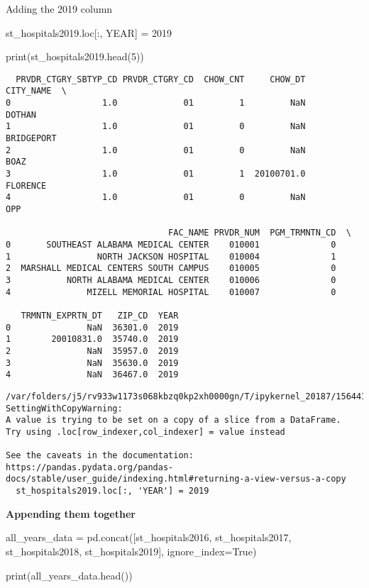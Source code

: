 \documentclass[
  letterpaper,
  DIV=11,
  numbers=noendperiod]{scrartcl}
\newenvironment{Shaded}{\begin{snugshade}}{\end{snugshade}}
\newcommand{\BuiltInTok}[1]{\textcolor[rgb]{0.00,0.23,0.31}{#1}}
\newcommand{\DecValTok}[1]{\textcolor[rgb]{0.68,0.00,0.00}{#1}}
\newcommand{\NormalTok}[1]{\textcolor[rgb]{0.00,0.23,0.31}{#1}}
\newcommand{\OperatorTok}[1]{\textcolor[rgb]{0.37,0.37,0.37}{#1}}
\newcommand{\StringTok}[1]{\textcolor[rgb]{0.13,0.47,0.30}{#1}}
\newcommand{\VariableTok}[1]{\textcolor[rgb]{0.07,0.07,0.07}{#1}}
\begin{document}
Adding the 2019 column

\begin{Shaded}
\begin{Highlighting}[]
\NormalTok{st\_hospitals2019.loc[:, }\StringTok{\textquotesingle{}YEAR\textquotesingle{}}\NormalTok{] }\OperatorTok{=} \DecValTok{2019}

\BuiltInTok{print}\NormalTok{(st\_hospitals2019.head(}\DecValTok{5}\NormalTok{))}
\end{Highlighting}
\end{Shaded}

\begin{verbatim}
  PRVDR_CTGRY_SBTYP_CD PRVDR_CTGRY_CD  CHOW_CNT     CHOW_DT   CITY_NAME  \
0                  1.0             01         1         NaN      DOTHAN   
1                  1.0             01         0         NaN  BRIDGEPORT   
2                  1.0             01         0         NaN        BOAZ   
3                  1.0             01         1  20100701.0    FLORENCE   
4                  1.0             01         0         NaN         OPP   

                                FAC_NAME PRVDR_NUM  PGM_TRMNTN_CD  \
0       SOUTHEAST ALABAMA MEDICAL CENTER    010001              0   
1                 NORTH JACKSON HOSPITAL    010004              1   
2  MARSHALL MEDICAL CENTERS SOUTH CAMPUS    010005              0   
3           NORTH ALABAMA MEDICAL CENTER    010006              0   
4               MIZELL MEMORIAL HOSPITAL    010007              0   

   TRMNTN_EXPRTN_DT   ZIP_CD  YEAR  
0               NaN  36301.0  2019  
1        20010831.0  35740.0  2019  
2               NaN  35957.0  2019  
3               NaN  35630.0  2019  
4               NaN  36467.0  2019  
\end{verbatim}

\begin{verbatim}
/var/folders/j5/rv933w1173s068kbzq0kp2xh0000gn/T/ipykernel_20187/1564410207.py:1: SettingWithCopyWarning: 
A value is trying to be set on a copy of a slice from a DataFrame.
Try using .loc[row_indexer,col_indexer] = value instead

See the caveats in the documentation: https://pandas.pydata.org/pandas-docs/stable/user_guide/indexing.html#returning-a-view-versus-a-copy
  st_hospitals2019.loc[:, 'YEAR'] = 2019
\end{verbatim}

\textbf{Appending them together}

\begin{Shaded}
\begin{Highlighting}[]
\NormalTok{all\_years\_data }\OperatorTok{=}\NormalTok{ pd.concat([st\_hospitals2016, st\_hospitals2017, st\_hospitals2018, st\_hospitals2019], ignore\_index}\OperatorTok{=}\VariableTok{True}\NormalTok{)}

\BuiltInTok{print}\NormalTok{(all\_years\_data.head())}
\end{Highlighting}
\end{Shaded}
\end{document}

